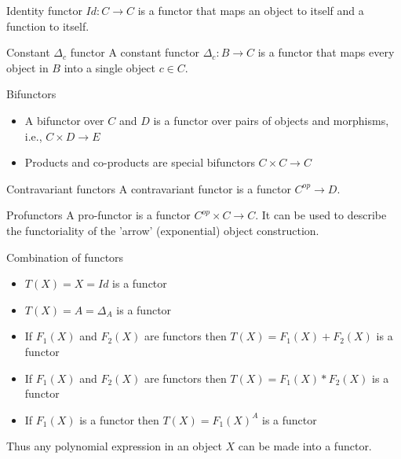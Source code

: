 \documentclass[presentation]{beamer}
\begin{document}
\begin{frame}[label={sec:org7453bd5}]{Identity functor}
\(Id: C \rightarrow C\) is a functor that maps an object to itself and a
function to itself.
\end{frame}

\begin{frame}[label={sec:orgc8759d7}]{Constant \(\Delta_c\) functor}
A constant functor \(\Delta_c: B \rightarrow C\) is a functor that maps every
object in \(B\) into a single object \(c \in C\).
\end{frame}

\begin{frame}[label={sec:orgd743c18}]{Bifunctors}
\begin{itemize}
\item A bifunctor over \(C\) and \(D\) is a functor over pairs of objects and morphisms,
i.e., \(C \times D \rightarrow E\)

\item Products and co-products are special bifunctors \(C \times C \rightarrow C\)
\end{itemize}
\end{frame}

\begin{frame}[label={sec:orgb688f43}]{Contravariant functors}
A contravariant functor is a functor \(C^{op} \rightarrow D\).
\end{frame}

\begin{frame}[label={sec:org8eaa817}]{Profunctors}
A pro-functor is a functor \(C^{op} \times C \rightarrow C\). It can be used
to describe the functoriality of the 'arrow' (exponential) object construction.
\end{frame}

\begin{frame}[label={sec:orgc163af0}]{Combination of functors}
\begin{itemize}
\item \(T(X) = X = Id\) is a functor

\item \(T(X) = A = \Delta_A\) is a functor

\item If \(F_1(X)\) and \(F_2(X)\) are functors then \(T(X) = F_1(X) + F_2(X)\) is a
functor
\item If \(F_1(X)\) and \(F_2(X)\) are functors then \(T(X) = F_1(X) * F_2(X)\) is a functor

\item If \(F_1(X)\) is a functor then \(T(X) = F_1(X)^A\) is a functor
\end{itemize}


Thus any polynomial expression in an object \(X\) can be made into a functor.
\end{frame}
\end{document}
